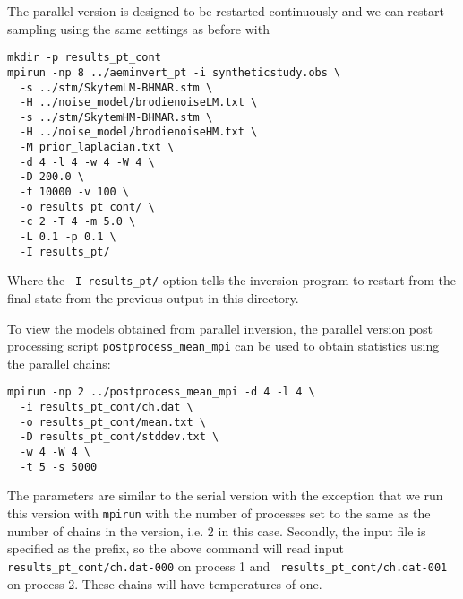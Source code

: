 \documentclass[a4paper,12pt]{article}
\begin{document}
The parallel version is designed to be restarted continuously and we can
restart sampling using the same settings as before with

\begin{verbatim}
mkdir -p results_pt_cont
mpirun -np 8 ../aeminvert_pt -i syntheticstudy.obs \
  -s ../stm/SkytemLM-BHMAR.stm \
  -H ../noise_model/brodienoiseLM.txt \
  -s ../stm/SkytemHM-BHMAR.stm \
  -H ../noise_model/brodienoiseHM.txt \
  -M prior_laplacian.txt \
  -d 4 -l 4 -w 4 -W 4 \
  -D 200.0 \
  -t 10000 -v 100 \
  -o results_pt_cont/ \
  -c 2 -T 4 -m 5.0 \
  -L 0.1 -p 0.1 \
  -I results_pt/
\end{verbatim}

Where the {\tt -I results\_pt/} option tells the inversion program to restart from
the final state from the previous output in this directory.

To view the models obtained from parallel inversion, the parallel version post processing
script {\tt postprocess\_mean\_mpi} can be used to obtain statistics using the parallel
chains:

\begin{verbatim}
mpirun -np 2 ../postprocess_mean_mpi -d 4 -l 4 \
  -i results_pt_cont/ch.dat \
  -o results_pt_cont/mean.txt \
  -D results_pt_cont/stddev.txt \
  -w 4 -W 4 \
  -t 5 -s 5000
\end{verbatim}

The parameters are similar to the serial version with the exception
that we run this version with {\tt mpirun} with the number of
processes set to the same as the number of chains in the version,
i.e. 2 in this case. Secondly, the input file is specified as the
prefix, so the above command will read input {\tt
  results\_pt\_cont/ch.dat-000} on process 1 and {\tt
  results\_pt\_cont/ch.dat-001} on process 2. These chains will have
temperatures of one.



\end{document}

